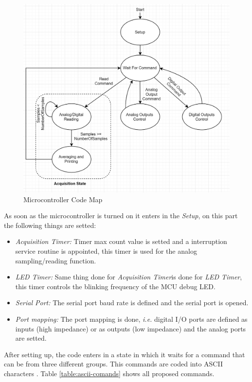 	\begin{figure}[htbp]
		\centering
		\includegraphics[scale=1]{figuras/fig-microCodeMap}
		\caption{Microcontroller Code Map}
		\label{fig:microCode}
	\end{figure}
	
	
	As soon as the microcontroller is turned on it enters in the \textit{Setup}, on this part the following things are setted:
	\begin{itemize}
		\item \textit{Acquisition Timer:} Timer max count value is setted and a interruption service routine is appointed, this timer is used for the analog sampling/reading function.\label{itm:mcu-prog-timer1}
		\item \textit{LED Timer:} Same thing done for \textit{Acquisition Timer}is done for \textit{LED Timer}, this timer controls the blinking frequency of the MCU debug LED.\label{itm:mcu-prog-timer2}
		\item \textit{Serial Port: } The serial port baud rate is defined and the serial port is opened.\label{itm:mcu-prog-serial-port}
		\item \textit{Port mapping: } The port mapping is done, \textit{i.e.} digital I/O ports are defined as inputs (high impedance) or as outputs (low impedance) and the analog ports are setted.\label{itm:mcu-prog-port}
	\end{itemize}
	
	After setting up, the code enters in a state in which it waits for a command that can be from three different groups. This commands are coded into ASCII characters \cite{ascii}. Table \ref{table:ascii-comands} shows all proposed commands.

